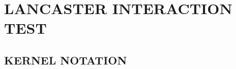 \documentclass[]{article}
\begin{document}
%
%
%

\section{LANCASTER INTERACTION TEST}\label{section:main}

\subsection{KERNEL NOTATION}
\end{document}
